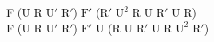 F (U R $\text{U}'$ $\text{R}'$) $\text{F}'$ ($\text{R}'$ $\text{U}^2$ R U $\text{R}'$ U R)\\
F (U R $\text{U}'$ $\text{R}'$) $\text{F}'$ U (R U $\text{R}'$ U R $\text{U}^2$ $\text{R}'$)\\
